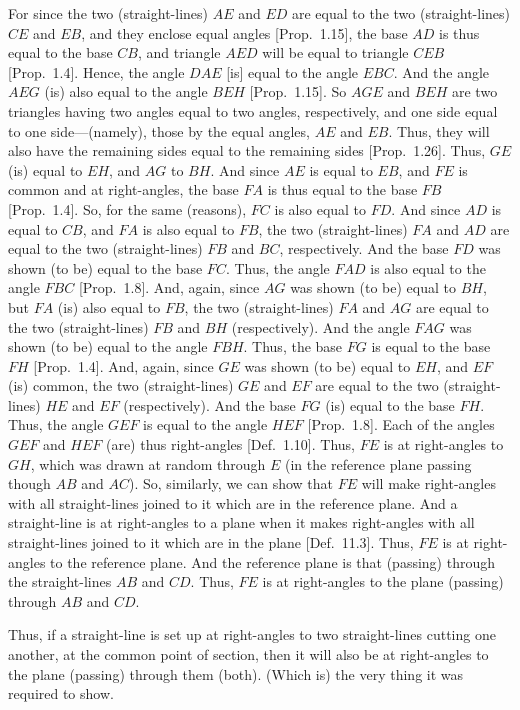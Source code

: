 \begin{Parallel}{}{}
{For since the two (straight-lines) $AE$ and $ED$ are equal to the two (straight-lines) $CE$ and $EB$, and they  enclose equal angles [Prop.~1.15], the base $AD$ is thus equal to the
base $CB$, and triangle $AED$ will be equal to triangle $CEB$ [Prop.~1.4]. Hence, the angle $DAE$ [is] equal to
the angle $EBC$. And the angle $AEG$ (is)  also equal to the angle
$BEH$ [Prop.~1.15]. So $AGE$ and $BEH$
are two triangles having two angles equal to two angles, respectively, and
one side equal to one side---(namely), those by the equal angles, $AE$ and $EB$. Thus, they will also have the remaining sides equal to the remaining
sides [Prop.~1.26]. Thus, $GE$ (is) equal to $EH$, 
and $AG$ to $BH$. And since $AE$ is equal to $EB$, and $FE$ is
common and at right-angles, the base $FA$ is thus equal to the base $FB$ [Prop.~1.4]. So, for the same (reasons), $FC$ is also
equal to $FD$. And since $AD$ is equal to $CB$, and $FA$ is also equal to
$FB$, the two (straight-lines) $FA$ and $AD$ are equal to the
two (straight-lines) $FB$ and $BC$, respectively. And the base $FD$
was shown (to be) equal to the base $FC$. Thus, the angle $FAD$ is also
equal to the angle $FBC$ [Prop.~1.8]. And, again,
since $AG$ was shown (to be) equal to $BH$, but $FA$ (is) also equal to
$FB$, the two (straight-lines) $FA$ and $AG$ are equal to the
two (straight-lines) $FB$ and $BH$ (respectively). And the angle $FAG$
was shown (to be) equal to the angle $FBH$. Thus, the base $FG$ is equal
to the base $FH$ [Prop.~1.4]. And, again, since
$GE$ was shown (to be) equal to $EH$, and $EF$ (is) common, the two
(straight-lines) $GE$ and $EF$ are equal to the two (straight-lines)
$HE$ and $EF$ (respectively). And the base $FG$
(is) equal to the base $FH$. Thus, the angle $GEF$ is equal to the
angle $HEF$ [Prop.~1.8]. Each of the
angles $GEF$ and $HEF$ (are) thus right-angles [Def.~1.10]. Thus, $FE$ is
at right-angles to $GH$, which was drawn at random through $E$ (in the reference plane passing though $AB$ and $AC$). So, similarly, we can show that
$FE$ will make right-angles with all straight-lines joined to it which are in the reference plane. And a straight-line is at right-angles
to a plane when it makes right-angles with all straight-lines joined to
it which are in the plane [Def.~11.3]. Thus,
$FE$ is at right-angles to the reference plane. And the reference plane
is that (passing) through the straight-lines $AB$ and $CD$. Thus,
$FE$ is at right-angles to the plane (passing) through $AB$ and
$CD$.

Thus, if a straight-line is set up at right-angles to two straight-lines cutting one another, at the common point of section, then it will also be
at right-angles to the plane (passing) through them (both). (Which is)
the very thing it was required to show.}
\end{Parallel}

